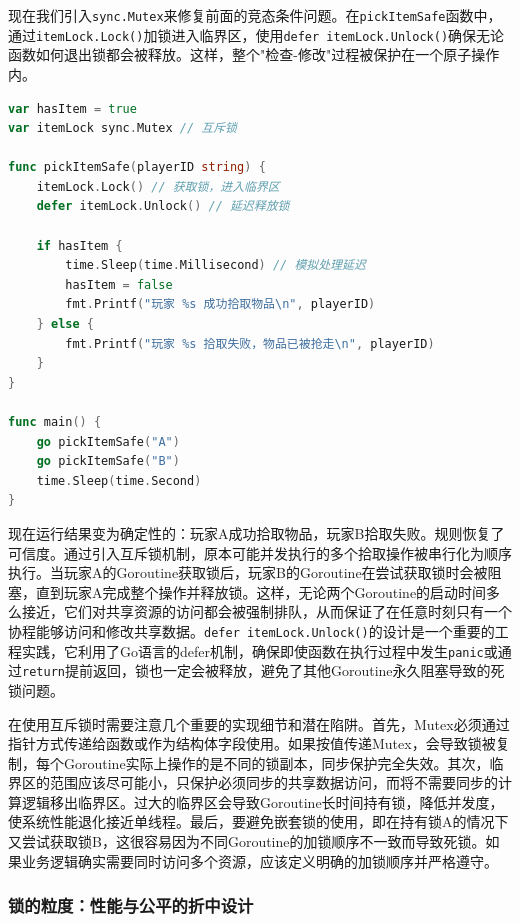 现在我们引入\texttt{sync.Mutex}来修复前面的竞态条件问题。在\texttt{pickItemSafe}函数中，通过\texttt{itemLock.Lock()}加锁进入临界区，使用\texttt{defer itemLock.Unlock()}确保无论函数如何退出锁都会被释放。这样，整个"检查-修改"过程被保护在一个原子操作内。

\begin{tcolorbox}[title=安全代码：使用Mutex保护共享资源]
\begin{lstlisting}[style=codeblock, language=go]
var hasItem = true
var itemLock sync.Mutex // 互斥锁

func pickItemSafe(playerID string) {
    itemLock.Lock() // 获取锁，进入临界区
    defer itemLock.Unlock() // 延迟释放锁
    
    if hasItem {
        time.Sleep(time.Millisecond) // 模拟处理延迟
        hasItem = false
        fmt.Printf("玩家 %s 成功拾取物品\n", playerID)
    } else {
        fmt.Printf("玩家 %s 拾取失败，物品已被抢走\n", playerID)
    }
}

func main() {
    go pickItemSafe("A")
    go pickItemSafe("B")
    time.Sleep(time.Second)
}
\end{lstlisting}
\end{tcolorbox}

现在运行结果变为确定性的：玩家A成功拾取物品，玩家B拾取失败。规则恢复了可信度。通过引入互斥锁机制，原本可能并发执行的多个拾取操作被串行化为顺序执行。当玩家A的Goroutine获取锁后，玩家B的Goroutine在尝试获取锁时会被阻塞，直到玩家A完成整个操作并释放锁。这样，无论两个Goroutine的启动时间多么接近，它们对共享资源的访问都会被强制排队，从而保证了在任意时刻只有一个协程能够访问和修改共享数据。\texttt{defer itemLock.Unlock()}的设计是一个重要的工程实践，它利用了Go语言的defer机制，确保即使函数在执行过程中发生\texttt{panic}或通过\texttt{return}提前返回，锁也一定会被释放，避免了其他Goroutine永久阻塞导致的死锁问题。

在使用互斥锁时需要注意几个重要的实现细节和潜在陷阱。首先，Mutex必须通过指针方式传递给函数或作为结构体字段使用。如果按值传递Mutex，会导致锁被复制，每个Goroutine实际上操作的是不同的锁副本，同步保护完全失效。其次，临界区的范围应该尽可能小，只保护必须同步的共享数据访问，而将不需要同步的计算逻辑移出临界区。过大的临界区会导致Goroutine长时间持有锁，降低并发度，使系统性能退化接近单线程。最后，要避免嵌套锁的使用，即在持有锁A的情况下又尝试获取锁B，这很容易因为不同Goroutine的加锁顺序不一致而导致死锁。如果业务逻辑确实需要同时访问多个资源，应该定义明确的加锁顺序并严格遵守。

\subsubsection{锁的粒度：性能与公平的折中设计}

